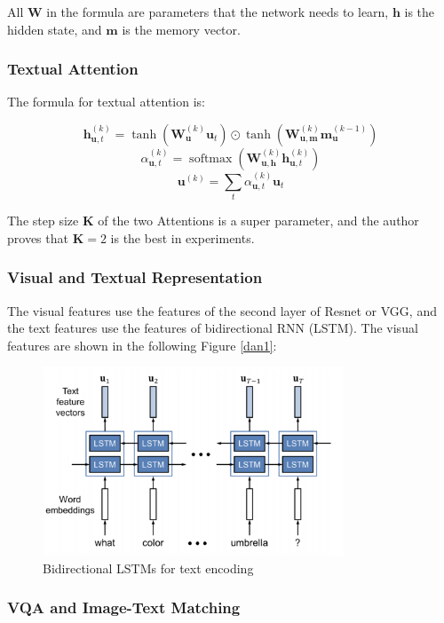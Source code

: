 All $\mathbf{W}$ in the formula are parameters that the network needs to learn, $\mathbf{h}$ is the hidden state, and $\mathbf{m}$ is the memory vector.

\subsubsection{Textual Attention}
The formula for textual attention is:

$$
\mathbf{h}_{\mathbf{u}, t}^{(k)} =\tanh \left(\mathbf{W}_{\mathbf{u}}^{(k)} \mathbf{u}_{t}\right) \odot \tanh \left(\mathbf{W}_{\mathbf{u}, \mathbf{m}}^{(k)} \mathbf{m}_{\mathbf{u}}^{(k-1)}\right)
$$
$$
\alpha_{\mathbf{u}, t}^{(k)}=\operatorname{softmax}\left(\mathbf{W}_{\mathbf{u}, \mathbf{h}}^{(k)} \mathbf{h}_{\mathbf{u}, t}^{(k)}\right)
$$
$$
\mathbf{u}^{(k)}=\sum_{t} \alpha_{\mathbf{u}, t}^{(k)} \mathbf{u}_{t}
$$

The step size $\mathbf{K}$ of the two Attentions is a super parameter, and the author proves that $\mathbf{K}=2$ is the best in experiments.

\subsubsection{Visual and Textual Representation}

The visual features use the features of the second layer of Resnet or VGG, and the text features use the features of bidirectional RNN (LSTM). The visual features are shown in the following Figure \ref{dan1}:

\begin{figure}[h!]
\centering
\includegraphics[width=0.8\textwidth]{dans1.pdf}
\caption{Bidirectional LSTMs for text encoding \cite{dan}}
\label{fig:dan1}
\end{figure}

\subsubsection{VQA and Image-Text Matching}

